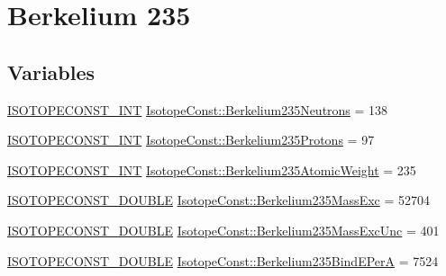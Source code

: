 \hypertarget{group___isotope_const-_berkelium-_bk235}{}\section{Berkelium 235}
\label{group___isotope_const-_berkelium-_bk235}
\subsection*{Variables}
\begin{DoxyCompactItemize}
\item 
\mbox{\hyperlink{group___isotope_const-_macros_ga5f18360b3e99483a35c32d789e62621c}{I\+S\+O\+T\+O\+P\+E\+C\+O\+N\+S\+T\+\_\+\+I\+NT}} \mbox{\hyperlink{group___isotope_const-_berkelium-_bk235_ga72a61027a318a0761a7d6aa1095aba06}{Isotope\+Const\+::\+Berkelium235\+Neutrons}} = 138
\item 
\mbox{\hyperlink{group___isotope_const-_macros_ga5f18360b3e99483a35c32d789e62621c}{I\+S\+O\+T\+O\+P\+E\+C\+O\+N\+S\+T\+\_\+\+I\+NT}} \mbox{\hyperlink{group___isotope_const-_berkelium-_bk235_gafb34bb42d9ba55870d48588672130816}{Isotope\+Const\+::\+Berkelium235\+Protons}} = 97
\item 
\mbox{\hyperlink{group___isotope_const-_macros_ga5f18360b3e99483a35c32d789e62621c}{I\+S\+O\+T\+O\+P\+E\+C\+O\+N\+S\+T\+\_\+\+I\+NT}} \mbox{\hyperlink{group___isotope_const-_berkelium-_bk235_gabf19b7e55cf59929415a10276dbf5932}{Isotope\+Const\+::\+Berkelium235\+Atomic\+Weight}} = 235
\item 
\mbox{\hyperlink{group___isotope_const-_macros_ga8f45a7272ce02c0b4c65c44636ed719a}{I\+S\+O\+T\+O\+P\+E\+C\+O\+N\+S\+T\+\_\+\+D\+O\+U\+B\+LE}} \mbox{\hyperlink{group___isotope_const-_berkelium-_bk235_gad45218ed9ace9349616c6a656540fe63}{Isotope\+Const\+::\+Berkelium235\+Mass\+Exc}} = 52704
\item 
\mbox{\hyperlink{group___isotope_const-_macros_ga8f45a7272ce02c0b4c65c44636ed719a}{I\+S\+O\+T\+O\+P\+E\+C\+O\+N\+S\+T\+\_\+\+D\+O\+U\+B\+LE}} \mbox{\hyperlink{group___isotope_const-_berkelium-_bk235_ga960e0f6d2b988386c9455991507ca1c6}{Isotope\+Const\+::\+Berkelium235\+Mass\+Exc\+Unc}} = 401
\item 
\mbox{\hyperlink{group___isotope_const-_macros_ga8f45a7272ce02c0b4c65c44636ed719a}{I\+S\+O\+T\+O\+P\+E\+C\+O\+N\+S\+T\+\_\+\+D\+O\+U\+B\+LE}} \mbox{\hyperlink{group___isotope_const-_berkelium-_bk235_ga5a854b7958dc9efd5765ba5efcbf11b1}{Isotope\+Const\+::\+Berkelium235\+Bind\+E\+PerA}} = 7524
\item 

\end{DoxyCompactItemize}
